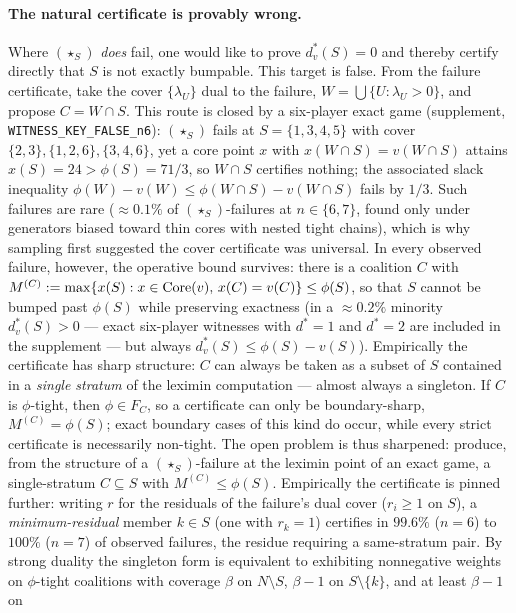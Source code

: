 \paragraph{The natural certificate is provably wrong.} Where $(\star_S)$
\emph{does} fail, one would like to prove $d^*_v(S)=0$ and thereby certify
directly that $S$ is not exactly bumpable. This target is
false. From the failure certificate, take the cover
$\{\lambda_U\}$ dual to the failure, $W=\bigcup\{U:\lambda_U>0\}$, and propose
$C=W\cap S$. This route is closed by a six-player exact game (supplement,
\texttt{WITNESS\_KEY\_FALSE\_n6}): $(\star_S)$ fails at $S=\{1,3,4,5\}$ with cover
$\{2,3\},\{1,2,6\},\{3,4,6\}$, yet a core point $x$ with $x(W\cap S)=v(W\cap S)$
attains $x(S)=24>\phi(S)=71/3$, so $W\cap S$ certifies nothing; the associated
slack inequality $\phi(W)-v(W)\le\phi(W\cap S)-v(W\cap S)$ fails by $1/3$. Such
failures are rare ($\approx0.1\%$ of $(\star_S)$-failures at $n\in\{6,7\}$, found
only under generators biased toward thin cores with nested tight chains), which is
why sampling first suggested the cover certificate was universal. In every
observed failure, however, the operative bound survives: there is a coalition $C$
with $M^{(C)}:=\max\{x(S):x\in\operatorname{Core}(v),\,x(C)=v(C)\}\le\phi(S)$, so that $S$
cannot be bumped past $\phi(S)$ while preserving exactness (in a $\approx0.2\%$
minority $d^*_v(S)>0$ --- exact six-player witnesses with $d^*=1$ and $d^*=2$ are
included in the supplement --- but always $d^*_v(S)\le\phi(S)-v(S)$). Empirically the
certificate has sharp structure: $C$ can always be taken as a subset of $S$
contained in a \emph{single stratum} of the leximin computation --- almost always
a singleton.  If $C$ is $\phi$-tight, then $\phi\in F_C$, so a certificate can
only be boundary-sharp, $M^{(C)}=\phi(S)$; exact boundary cases of this kind do
occur, while every strict certificate is necessarily non-tight. The open problem is
thus sharpened: produce, from the structure of a $(\star_S)$-failure at the
leximin point of an exact game, a single-stratum $C\subseteq S$ with
$M^{(C)}\le\phi(S)$. Empirically the certificate is pinned further: writing $r$
for the residuals of the failure's dual cover ($r_i\ge1$ on $S$), a
\emph{minimum-residual} member $k\in S$ (one with $r_k=1$) certifies in
$99.6\%$ ($n=6$) to $100\%$ ($n=7$) of observed failures, the residue requiring
a same-stratum pair. By strong duality the singleton form is equivalent to
exhibiting nonnegative weights on $\phi$-tight coalitions with coverage $\beta$
on $N\setminus S$, $\beta-1$ on $S\setminus\{k\}$, and at least $\beta-1$ on

